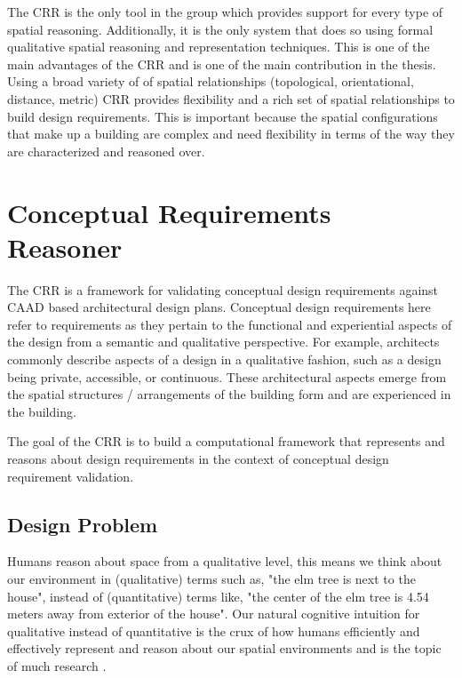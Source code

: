 \documentclass[12pt]{ucthesis}
\begin{document}
The CRR is the only tool in the group which provides support for every type of spatial reasoning. Additionally, it is the only system that does so using formal qualitative spatial reasoning and representation techniques. This is one of the main advantages of the CRR and is one of the main contribution in the thesis. Using a broad variety of of spatial relationships (topological, orientational, distance, metric) CRR provides flexibility and a rich set of spatial relationships to build design requirements. This is important because the spatial configurations that make up a building are complex and need flexibility in terms of the way they are characterized and reasoned over. 


\chapter{Conceptual Requirements Reasoner}
The CRR is a framework for validating conceptual design requirements against CAAD based architectural design plans. Conceptual design requirements here refer to requirements as they pertain to the functional and experiential aspects of the design from a semantic and qualitative perspective. For example, architects commonly describe aspects of a design in a qualitative fashion, such as a design being private, accessible, or continuous. These architectural aspects emerge from the spatial structures / arrangements of the building form and are experienced in the building. 

The goal of the CRR is to build a computational framework that represents and reasons about design requirements in the context of conceptual design requirement validation.     

\section{Design Problem}
Humans reason about space from a qualitative level, this means we think about our environment in (qualitative) terms such as, "the elm tree is next to the house", instead of (quantitative) terms like, "the center of the elm tree is 4.54 meters away from exterior of the house". Our natural cognitive intuition for qualitative instead of quantitative is the crux of how humans efficiently and effectively represent and reason about our spatial environments and is the topic of much research \cite{freksa1991qsr} \cite{Cohn:2001:QSR}.


\end{document}
